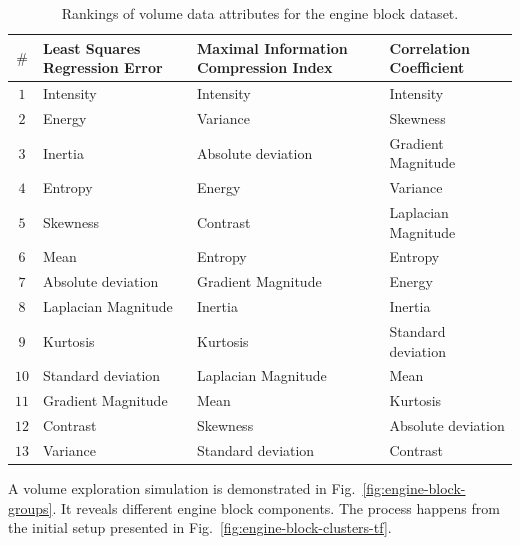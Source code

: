 \begin{table}[htb!]
    \caption{Rankings of volume data attributes for the engine block dataset.}
    \label{tab:feature-ranking-for-engine-block}
    \centering
    \begin{tabular}{@{}c>{\centering\arraybackslash}m{}>{\centering\arraybackslash}m{}>{\centering\arraybackslash}m{}@{}}
        \toprule
         \textbf{$\#$} & \textbf{Least Squares Regression Error} & \textbf{Maximal Information Compression Index} & \textbf{Correlation Coefficient}\\
        \midrule
        $1$ & Intensity &  Intensity &  Intensity \\
        \hline
        $2$ & Energy &  Variance &  Skewness \\
        \hline
        $3$ & Inertia &  Absolute deviation & Gradient Magnitude \\
        \hline
        $4$ & Entropy &  Energy &  Variance \\
        \hline
        $5$ & Skewness &  Contrast &  Laplacian Magnitude \\
        \hline
        $6$ & Mean &  Entropy &  Entropy \\
        \hline
        $7$ & Absolute deviation &  Gradient Magnitude &  Energy \\
        \hline
        $8$ & Laplacian Magnitude &  Inertia &  Inertia \\
        \hline
        $9$ & Kurtosis &  Kurtosis &  Standard deviation \\
        \hline
        $10$ & Standard deviation &  Laplacian Magnitude &  Mean \\
        \hline
        $11$ & Gradient Magnitude &  Mean &  Kurtosis \\
        \hline
        $12$ & Contrast &  Skewness &  Absolute deviation \\
        \hline
        $13$ & Variance &  Standard deviation &  Contrast \\
        \bottomrule
    \end{tabular}
\end{table}

A volume exploration simulation is demonstrated in Fig.~\ref{fig:engine-block-groups}. It reveals different engine block components. The process happens from the initial setup presented in Fig.~\ref{fig:engine-block-clusters-tf}. 

